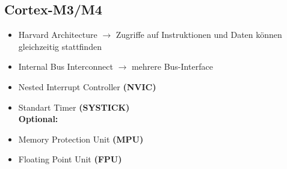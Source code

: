 \subsection{Cortex-M3/M4}
\begin{multicols}{2}
    \begin{itemize}
        \item Harvard Architecture
            \subitem $\rightarrow$  Zugriffe auf Instruktionen und Daten
            \subitem \qquad können gleichzeitig stattfinden
        \item Internal Bus Interconnect
            \subitem $\rightarrow$ mehrere Bus-Interface 
        \item Nested Interrupt Controller \textbf{(NVIC)}
        \item Standart Timer \textbf{(SYSTICK)}\\
        \textbf{Optional:}
        \item Memory Protection Unit \textbf{(MPU)}
        \item Floating Point Unit \textbf{(FPU)}
    \end{itemize}
\end{multicols}


